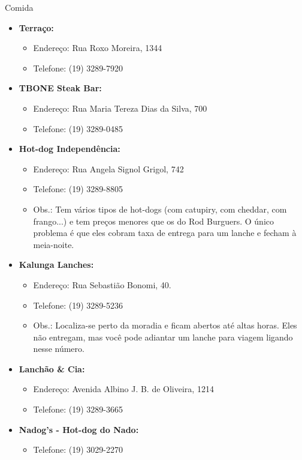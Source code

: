 \begin{story}{Comida}
\begin{itemize}
\item \textbf{Terraço:}
\begin{itemize}
\item Endereço: Rua Roxo Moreira, 1344
\item Telefone: (19) 3289-7920
\end{itemize}

\item \textbf{TBONE Steak Bar:}
\begin{itemize}
\item Endereço: Rua Maria Tereza Dias da Silva, 700
\item Telefone: (19) 3289-0485
\end{itemize}

\item \textbf{Hot-dog Independência:}
\begin{itemize}
\item Endereço: Rua Angela Signol Grigol, 742
\item Telefone: (19) 3289-8805
\item Obs.: Tem vários tipos de hot-dogs (com catupiry, com cheddar, com frango...) e tem preços menores que os do Rod Burguers. O único problema é que eles cobram taxa de entrega para um lanche e fecham à meia-noite.
\end{itemize}

\item \textbf{Kalunga Lanches:}
\begin{itemize}
\item Endereço: Rua Sebastião Bonomi, 40. 
\item Telefone: (19) 3289-5236
\item Obs.: Localiza-se perto da moradia e ficam abertos até altas horas. Eles não entregam, mas você pode adiantar um lanche para viagem ligando nesse número.
\end{itemize}

\item \textbf{Lanchão \& Cia:}
\begin{itemize}
\item Endereço: Avenida Albino J. B. de Oliveira, 1214
\item Telefone: (19) 3289-3665
\end{itemize}

\item \textbf{Nadog's - Hot-dog do Nado:}
\begin{itemize}
\item Telefone: (19) 3029-2270
\end{itemize}


\end{itemize}
\end{story}
